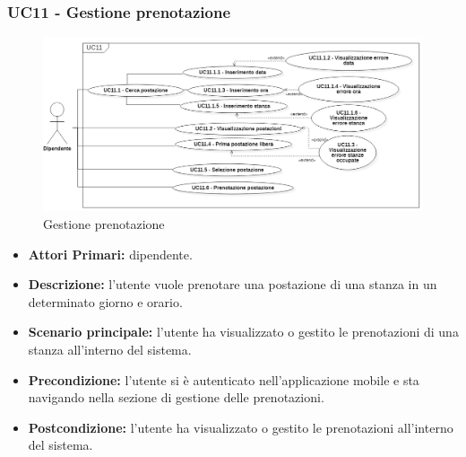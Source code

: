 \subsubsection{ UC11 - Gestione prenotazione }
\begin{figure}[H]
	\centering
	\includegraphics[width=18cm]{res/images/UC11.png}
	\caption{Gestione prenotazione}
	\label{fig:Gestione prenotazione}
\end{figure}
\begin{itemize}
	\item\textbf{Attori Primari:} dipendente.
	\item\textbf{Descrizione:} l’utente vuole prenotare una postazione di una stanza in un determinato giorno e orario.
	\item\textbf{Scenario principale:} l’utente ha visualizzato o gestito le prenotazioni di una stanza all’interno del sistema.
	\item\textbf{Precondizione:} l’utente si è autenticato nell'applicazione mobile e sta navigando nella sezione di gestione delle prenotazioni.
	\item\textbf{Postcondizione:} l’utente ha visualizzato o gestito le prenotazioni all’interno del sistema.
\end{itemize}
